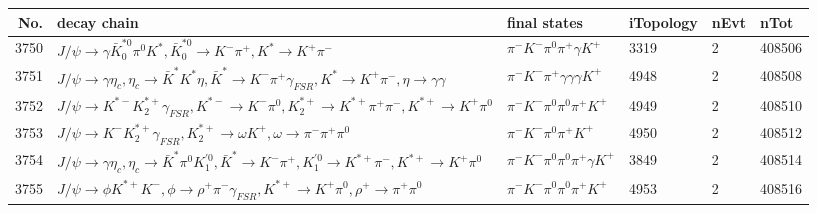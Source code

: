 \begin{table}[htbp] 
\begin{center}
\begin{small}
\begin{tabular}{rlllll}\hline\hline
 No. & decay chain & final states &  iTopology & nEvt & nTot \\\hline
3750&$J/\psi       \rightarrow \gamma       \bar{K}_0^{*0}\pi^{0}        K^{*}          , \bar{K}_0^{*0} \rightarrow K^{-}          \pi^{+}        , K^{*}           \rightarrow K^{+}          \pi^{-}        $&$\pi^{-}        K^{-}          \pi^{0}        \pi^{+}        \gamma       K^{+}          $& 3319&    2&408506\\
3751&$J/\psi       \rightarrow \gamma       \eta_{c}    , \eta_{c}     \rightarrow \bar{K}^{*}   K^{*}          \eta          , \bar{K}^{*}    \rightarrow K^{-}          \pi^{+}        \gamma_{FSR} , K^{*}           \rightarrow K^{+}          \pi^{-}        , \eta           \rightarrow \gamma       \gamma       $&$\pi^{-}        K^{-}          \pi^{+}        \gamma       \gamma       \gamma       K^{+}          $& 4948&    2&408508\\
3752&$J/\psi       \rightarrow K^{*-}         K_2^{*+}       \gamma_{FSR} , K^{*-}          \rightarrow K^{-}          \pi^{0}        , K_2^{*+}        \rightarrow K^{*+}         \pi^{+}        \pi^{-}        , K^{*+}          \rightarrow K^{+}          \pi^{0}        $&$\pi^{-}        K^{-}          \pi^{0}        \pi^{0}        \pi^{+}        K^{+}          $& 4949&    2&408510\\
3753&$J/\psi       \rightarrow K^{-}          K_2^{*+}       \gamma_{FSR} , K_2^{*+}        \rightarrow \omega         K^{+}          , \omega          \rightarrow \pi^{-}        \pi^{+}        \pi^{0}        $&$\pi^{-}        K^{-}          \pi^{0}        \pi^{+}        K^{+}          $& 4950&    2&408512\\
3754&$J/\psi       \rightarrow \gamma       \eta_{c}    , \eta_{c}     \rightarrow \bar{K}^{*}   \pi^{0}        K_1^{'0}      , \bar{K}^{*}    \rightarrow K^{-}          \pi^{+}        , K_1^{'0}       \rightarrow K^{*+}         \pi^{-}        , K^{*+}          \rightarrow K^{+}          \pi^{0}        $&$\pi^{-}        K^{-}          \pi^{0}        \pi^{0}        \pi^{+}        \gamma       K^{+}          $& 3849&    2&408514\\
3755&$J/\psi       \rightarrow \phi           K^{*+}         K^{-}          , \phi            \rightarrow \rho^{+}      \pi^{-}        \gamma_{FSR} , K^{*+}          \rightarrow K^{+}          \pi^{0}        , \rho^{+}       \rightarrow \pi^{+}        \pi^{0}        $&$\pi^{-}        K^{-}          \pi^{0}        \pi^{0}        \pi^{+}        K^{+}          $& 4953&    2&408516\\

\end{tabular}
\end{small}
\end{center}
\end{table}
